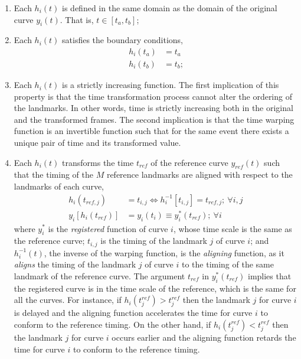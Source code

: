 \begin{enumerate}
	
	\item Each $h_i(t)$ is defined in the same domain as the domain of the original curve $y_i(t)$. That is, $t \in [t_a, t_b]$;
  
	\item Each $h_i(t)$ satisfies the boundary conditions,
    \begin{equation}
      \begin{split}
        h_i(t_a) & = t_a \\
        h_i(t_b) & = t_b \text{;}
      \end{split}
    \label{eq:warping_boundaries}
    \end{equation}
   
	\item Each $h_i(t)$ is a strictly increasing function. The first implication of this property is that the time transformation process cannot alter the ordering of the landmarks.
         In other words, time is strictly increasing both in the original and the transformed frames.
         The second implication is that the time warping function is an invertible function 
         such that for the same event there exists a unique pair of time and its transformed value.
  
	\item Each $h_i(t)$ transforms the time $t_{ref}$ of the reference curve $y_{ref}(t)$ such that the timing of the $M$ reference landmarks are aligned with respect to the landmarks of each curve,
          \begin{equation}
            \begin{split}
						  h_i (t_{ref,j}) 		& = t_{i,j} \iff h_i^{-1}[t_{i,j}] = t_{ref,j}  ; \ \forall i,j \\
							y_i [h_i(t_{ref})]  & =	y_i(t_{i}) \equiv y^*_i(t_{ref}) ; \ \forall i
            \end{split}
          \label{eq:warping_transformation}
          \end{equation}
          where $y_i^*$ is the \emph{registered} function of curve $i$, whose time scale is the same as the reference curve;
					$t_{i,j}$ is the timing of the landmark $j$ of curve $i$;
					and $h^{-1}_i(t)$, the inverse of the warping function, is the \emph{aligning} function, as it \emph{aligns} the timing of the landmark $j$ of curve $i$ to the timing of the same landmark of the reference curve. 
					The argument $t_{ref}$ in $y_i^*(t_{ref})$ implies that the registered curve is in the time scale of the reference, which is the same for all the curves.
          For instance, if $h_i(t^{ref}_j) > t^{ref}_j$ then the landmark $j$ for curve $i$ is delayed 
          and the aligning function accelerates the time for curve $i$ to conform to the reference timing.
          On the other hand, if $h_i(t^{ref}_j) < t^{ref}_j$ then the landmark $j$ for curve $i$ occurs earlier
          and the aligning function retards the time for curve $i$ to conform to the reference timing.
\end{enumerate}

